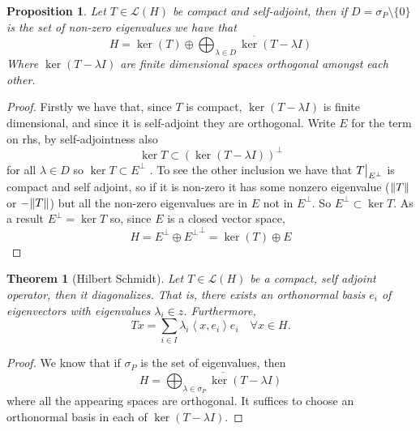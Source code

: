 \documentclass[12pt]{article}
\newcommand{\br}[1]{\left\langle#1\right\rangle}
\newcommand\restr[2]{{\left.\kern-\nulldelimiterspace #1\vphantom{\big|} \right|_{#2}}}
\newcommand{\R}zzzzz
\newtheorem{theorem}{Theorem}
\newtheorem{proposition}{Proposition}
\begin{document}
\begin{proposition}
	Let $T\in\mathcal{L}(H)$ be compact and self-adjoint, then if $D=\sigma_P\setminus\{0\}$ is the set of non-zero eigenvalues we have that
	\begin{equation*}
		H=\operatorname{ker}(T) \oplus \overline{\bigoplus_{\lambda \in D} \operatorname{ker}(T-\lambda I)}
	\end{equation*}
	Where $\operatorname{ker}(T-\lambda I)$ are finite dimensional spaces orthogonal amongst each other.
\end{proposition}
\begin{proof}
	Firstly we have that, since $T$ is compact, $\ker(T-\lambda I)$ is finite dimensional, and since it is self-adjoint they are orthogonal. Write $E$ for the term on rhs, by self-adjointness also
	\begin{equation*}
		\ker{T}\subset (\ker(T-\lambda I))^\perp
	\end{equation*}
	for all $\lambda\in D$ so $\ker{T}\subset E^\perp$ . To see the other inclusion we have that $\restr{T}{E^\perp}$ is compact and self adjoint, so if it is non-zero it has some nonzero eigenvalue ($\norm{T}$ or $-\norm{T}$) but all the non-zero eigenvalues are in $E$ not in $E^\perp$. So $E^\perp\subset\ker{T}$. As a result $E^\perp=\ker{T}$ so, since $E$ is a closed vector space,
	\begin{equation*}
		H=E^\perp\oplus {E^\perp}^\perp=\ker(T)\oplus E
	\end{equation*}
\end{proof}
\begin{theorem}[Hilbert Schmidt]\label{Hilber-Schmidt}
	Let $T\in\mathcal{L}(H)$ be a compact, self adjoint operator, then it diagonalizes. That is, there exists an orthonormal basis $e_i$ of eigenvectors with eigenvalues $\lambda_i\in\R$. Furthermore,
	\begin{equation*}
		Tx=\sum_{i\in I} \lambda_i\br{x,e_i}e_i\quad\forall x\in H.
	\end{equation*}
\end{theorem}
\begin{proof}
	We know that if $\sigma_P$ is the set of eigenvalues, then
	\begin{equation*}
		H= \overline{\bigoplus_{\lambda \in \sigma_P} \operatorname{ker}(T-\lambda I)}
	\end{equation*}
	where all the appearing spaces are orthogonal. It suffices to choose an orthonormal basis in each of $\operatorname{ker}(T-\lambda I)$.
\end{proof}
\end{document}
